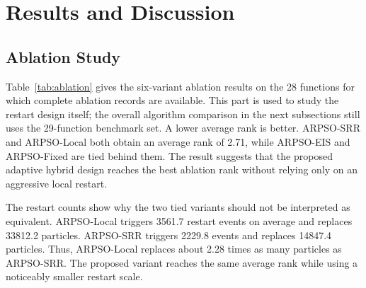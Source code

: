 \documentclass[conference]{IEEEtran}
\begin{document}
\section{Results and Discussion}\label{sec:results}

\subsection{Ablation Study}
Table~\ref{tab:ablation} gives the six-variant ablation results on the 28 functions for which complete ablation records are available. This part is used to study the restart design itself; the overall algorithm comparison in the next subsections still uses the 29-function benchmark set. A lower average rank is better. ARPSO-SRR and ARPSO-Local both obtain an average rank of 2.71, while ARPSO-EIS and ARPSO-Fixed are tied behind them. The result suggests that the proposed adaptive hybrid design reaches the best ablation rank without relying only on an aggressive local restart.

\begin{table}[!t]
    \caption{Six-Variant Ablation Results on the Functions with Complete Ablation Records}
    \centering
    \footnotesize
    \setlength{\tabcolsep}{2pt}
    \label{tab:ablation}
\end{table}

The restart counts show why the two tied variants should not be interpreted as equivalent. ARPSO-Local triggers 3561.7 restart events on average and replaces 33812.2 particles. ARPSO-SRR triggers 2229.8 events and replaces 14847.4 particles. Thus, ARPSO-Local replaces about 2.28 times as many particles as ARPSO-SRR. The proposed variant reaches the same average rank while using a noticeably smaller restart scale.
\end{document}

